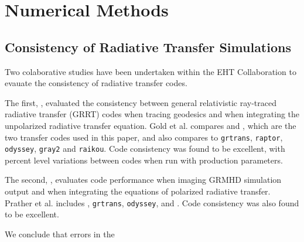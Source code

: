 \section{Numerical Methods}\label{app:numerical}

\subsection{Consistency of Radiative Transfer Simulations}\label{app:radtrans}


Two colaborative studies have been undertaken within the EHT Collaboration to evauate the consistency of radiative transfer codes. 

The first, \citep{2020ApJ...897..148G}, evaluated the consistency between general relativistic ray-traced radiative transfer (GRRT) codes when tracing geodesics and when integrating the unpolarized radiative transfer equation.  Gold et al. compares \bhoss and \ipole, which are the two transfer codes used in this paper, and  also compares to {\tt grtrans}, {\tt raptor}, {\tt odyssey}, {\tt gray2} and {\tt raikou}.  Code consistency was found to be excellent, with percent level variations between codes when run with production parameters.

The second, \citet{Prather_et_al_2022}, evaluates code performance when imaging GRMHD simulation output and when integrating the equations of polarized radiative transfer.  Prather et al. includes \ipole, {\tt grtrans}, {\tt odyssey}, and {\raptor}.  Code consistency was also found to be excellent.  

We conclude that errors in the 

